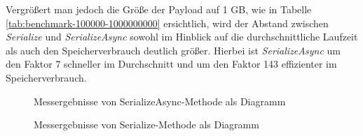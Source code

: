 Vergrößert man jedoch die Größe der Payload auf 1 GB, wie in Tabelle \ref{tab:benchmark-100000-1000000000} ersichtlich, wird der Abstand zwischen \textit{Serialize} und \textit{SerializeAsync} sowohl im Hinblick auf die durchschnittliche Laufzeit als auch den Speicherverbrauch deutlich größer. Hierbei ist \textit{SerializeAsync} um den Faktor 7 schneller im Durchschnitt und um den Faktor 143 effizienter im Speicherverbrauch.



\begin{figure}[h]
    \centering
    \caption{Messergebnisse von SerializeAsync-Methode als Diagramm}
    \label{fig:messergebnisse-serialize-async}
\end{figure}

\begin{figure}[h]
    \centering
    \caption{Messergebnisse von Serialize-Methode als Diagramm}
    \label{fig:messergebnisse-serialize}
\end{figure}